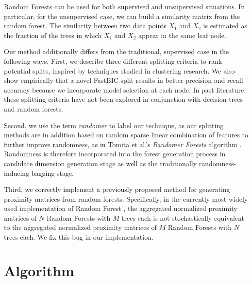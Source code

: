 Random Forests can be used for both supervised and unsupervised situations. In particular, for the unsupervised case, we can build a similarity matrix from the random forest. The similarity between two data points $X_1$ and $X_2$ is estimated as the fraction of the trees in which $X_1$ and $X_2$ appear in the same leaf node. 

Our method additionally differs from the traditional, supervised case in the following ways. First,  we describe three different splitting criteria to rank potential splits, inspired by techniques studied in clustering research. We also show empirically that a novel FastBIC split results in better precision and recall accuracy because we incorporate model selection at each node. In past literature, these splitting criteria have not been explored in conjunction with decision trees and random forests. 

Second, we use the term \textit{randomer} to label our technique, as our splitting methods are in addition based on random sparse linear combination of features to further improve randomness, as in Tomita et al.'s \textit{Randomer Forests} algorithm \cite{tomita2015randomer}. Randomness is therefore incorporated into the forest generation process in candidate dimension generation stage as well as the traditionally randomness-inducing bagging stage. 

Third, we correctly implement a previously proposed method for generating proximity matrices from random forests. Specifically, in the currently most widely used implementation of Random Forest \cite{LiawRF}, the aggregated normalized proximity matrices of $N$ Random Forests with $M$ trees each is not stochastically equivalent to the aggregated normalized proximity matrices of $M$ Random Forests with $N$ trees each. We fix this bug in our implementation.


\section{Algorithm}
 

